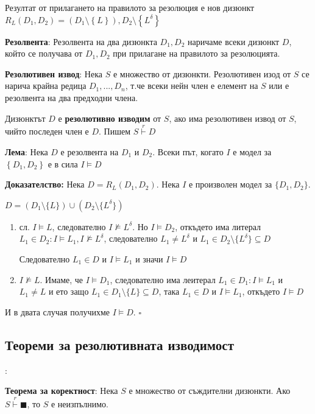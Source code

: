 \documentclass{article}
\renewcommand{\\}{\newline}
\newcommand{\doc}{\textbf{Доказателство: }}
\newcommand{\proven}{\hfill $\square$}
\begin{document}
Резултат от прилагането на правилото за резолюция е нов дизюнкт \(R_{L}(D_1, D_2) = \left(D_1 \setminus \left\{L\right\}\right), D_{2} \setminus \left\{L^{\delta}\right\}\) 

\textbf{Резолвента}: Резолвента на два дизюнкта \(D_1, D_2\) наричаме всеки дизюнкт \(D\), който се получава от \(D_1, D_2\) при прилагане на правилото за резолюцията.   

\textbf{Резолютивен извод}: Нека \(S\) е множество от дизюнкти. Резолютивен изод от \(S\) се нарича крайна редица \(D_1, ..., D_n\), т.че всеки нейн член е елемент на \(S\) или е резолвента на два предходни члена.    

Дизюнктът \(D\) е \textbf{резолютивно изводим} от \(S\), ако има резолютивен извод от \(S\), чийто последен член е \(D\). Пишем \(S \overset{r}{\vdash} D\)  

\textbf{Лема}: Нека \(D\) е резолвента на \(D_1\) и \(D_2\). Всеки път, когато \(I\) е модел за \(\left\{D_1, D_2\right\}\) е в сила \(I \vDash D\)       

\doc Нека \(D = R_{L}(D_1, D_2)\). Нека \(I \) е произволен модел за \(\{D_1, D_2\}\). 

\(D = (D_1 \setminus \{L\})\cup (D_2 \setminus \{L^{\delta}\})\)  
\begin{enumerate}
    \item сл. \(I \vDash L\), следователно \(I \not\vDash L^{\delta}\). Но \(I \vDash D_2\), откъдето има литерал \(L_1 \in D_2: I \vDash L_1, I \not\vDash L^{\delta}\), следователно \(L_1 \not= L^{\delta}\) и \(L_1 \in D_{2}\setminus \{L^{\delta}\} \subseteq D\) 

      Следователно \(L_1 \in D\) и \(I \vDash L_1\) и значи \(I \vDash D\)    
    
    \item \(I \not\vDash L\). Имаме, че \(I \vDash D_1\), следователно има леитерал \(L_1 \in D_1: I \vDash L_1\) и \(L_1 \not=L\) и ето защо \(L_1 \in D_1 \setminus \{L\} \subseteq D\), така \(L_1 \in D\) и \(I \vDash L_1\), откъдето \(I \vDash D\)          
\end{enumerate}

И в двата случая получихме \(I \vDash D\). \proven 

\subsection{Теореми за резолютивната изводимост}:

\textbf{Теорема за коректност}: Нека \(S\) е множество от съждителни дизюнкти. Ако \(S \overset{r}{\vdash}\blacksquare\), то \(S\) е неизпълнимо.   
\end{document}
